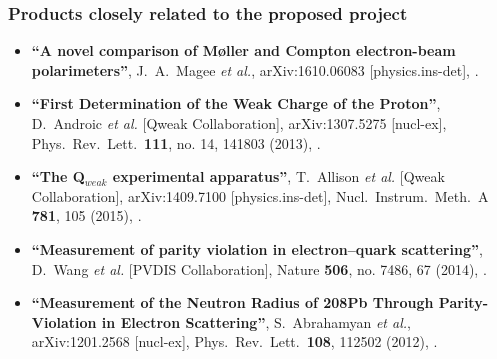 
\subsubsection*{Products closely related to the proposed project\footnotemark{}}


\begin{itemize}
 \setlength{\itemsep}{0pt}
 \setlength{\parskip}{0pt}
 \setlength{\parsep}{0pt}

 \item%
  {\bf ``A novel comparison of M{\o}ller and Compton electron-beam polarimeters''},
  J.~A.~Magee {\it et al.},
  arXiv:1610.06083 [physics.ins-det],
  \cite{Magee:2016xqx}.

 \item%
  {\bf ``First Determination of the Weak Charge of the Proton''},
  D.~Androic {\it et al.} [Qweak Collaboration],
  arXiv:1307.5275 [nucl-ex],
  Phys.\ Rev.\ Lett.\  {\bf 111}, no. 14, 141803 (2013),
  \cite{Androic:2013rhu}.
  
 \item%
  {\bf ``The Q$_{weak}$ experimental apparatus''},
  T.~Allison {\it et al.} [Qweak Collaboration],
  arXiv:1409.7100 [physics.ins-det],
  Nucl.\ Instrum.\ Meth.\ A {\bf 781}, 105 (2015),
  \cite{Allison:2014tpu}.

 \item%
  {\bf ``Measurement of parity violation in electron–quark scattering''},
  D.~Wang {\it et al.} [PVDIS Collaboration],
  Nature {\bf 506}, no. 7486, 67 (2014),
  \cite{Wang:2014bba}.

 \item%
  {\bf ``Measurement of the Neutron Radius of 208Pb Through Parity-Violation in Electron Scattering''},
  S.~Abrahamyan {\it et al.},
  arXiv:1201.2568 [nucl-ex],
  Phys.\ Rev.\ Lett.\  {\bf 108}, 112502 (2012),
  \cite{Abrahamyan:2012gp}.

\end{itemize}

